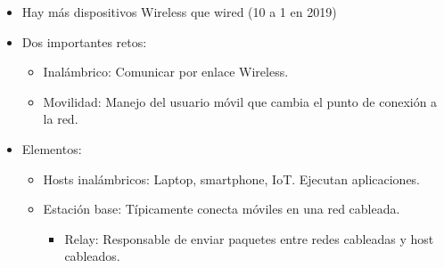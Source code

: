 \documentclass[12pt, twoside, openright]{report} %
\begin{document}
\begin{itemize}
	\item Hay más dispositivos Wireless que wired (10 a 1 en 2019)
	\item Dos importantes retos:

	      \begin{itemize}
		      \item Inalámbrico: Comunicar por enlace Wireless.
		      \item Movilidad: Manejo del usuario móvil que cambia el punto de
		            conexión a la red.
	      \end{itemize}
	      \pagebreak
	\item Elementos:

	      \begin{itemize}
		      \item Hosts inalámbricos: Laptop, smartphone, IoT. Ejecutan
		            aplicaciones.
		      \item Estación base: Típicamente conecta móviles en una red
		            cableada.
		            \begin{itemize}
			            \item Relay: Responsable de enviar paquetes entre redes cableadas y
			                  host cableados.
		            \end{itemize}


\end{itemize}
\end{itemize}
\end{document}
